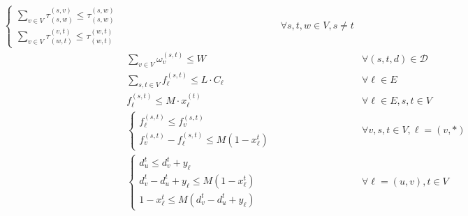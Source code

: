 \documentclass[a4paper,USenglish]{lipics-v2018}
\begin{document}
\begin{align}
\begin{cases*}
 \sum_{ v\in V} \tau^{(s,v)}_{(s,w)} \leq \tau^{(s,w)}_{(s,w)} \\
   \sum_{ v\in V} \tau^{(v,t)}_{(w,t)} \leq  \tau^{(w,t)}_{(w,t)} 
 \end{cases*}
 && \forall s,t,w \in V, s\neq t
 \\
 &\sum_{v \in V}  \omega^{(s,t)}_v \leq W
 && \forall (s,t,d) \in \mathcal{D}
 \label{LP:wp_limit} 
 \\
 & \sum_{ s,t \in V} f^{(s,t)}_{\ell} \leq L \cdot C_{\ell}
 && \forall \ell \in E
 \\
&   f^{(s,t)}_{\ell} \leq M \cdot x^{(t)}_{\ell}
&& \forall \ell \in E, s,t \in V
 \label{LP:SPTree} 
 \\
&
\begin{cases*}
	f^{(s,t)}_{\ell} \leq f^{(s,t)}_{v}	\\
	f^{(s,t)}_{v} - f^{(s,t)}_{\ell} \leq M(1 - x^{t}_{\ell}) 
\end{cases*}	
&& \forall v,s,t \in V, \ell = (v,*)
 \label{LP:equalSplit} 
\\ 
&\begin{cases*}
	d^{t}_u \leq d^{t}_v + y_{\ell} \\
	d^{t}_v - d^{t}_u + y_{\ell} \leq M(1 - x^t_{\ell})	\\
	1 - x^t_{\ell} \leq M(d^{t}_v - d^{t}_u + y_{\ell})
\end{cases*}
&& \forall \ell = (u,v),  t \in V
 \label{LP:weights} 
\end{align}
\end{document}
